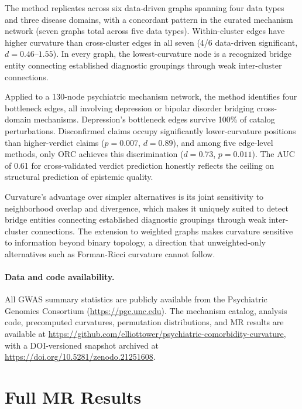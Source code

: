 \documentclass[11pt]{article}
\begin{document}
The method replicates across six data-driven graphs spanning four data types and three disease domains, with a concordant pattern in the curated mechanism network (seven graphs total across five data types). Within-cluster edges have higher curvature than cross-cluster edges in all seven (4/6 data-driven significant, $d = 0.46$--$1.55$). In every graph, the lowest-curvature node is a recognized bridge entity connecting established diagnostic groupings through weak inter-cluster connections.

Applied to a 130-node psychiatric mechanism network, the method identifies four bottleneck edges, all involving depression or bipolar disorder bridging cross-domain mechanisms. Depression's bottleneck edges survive 100\% of catalog perturbations. Disconfirmed claims occupy significantly lower-curvature positions than higher-verdict claims ($p = 0.007$, $d = 0.89$), and among five edge-level methods, only ORC achieves this discrimination ($d = 0.73$, $p = 0.011$). The AUC of 0.61 for cross-validated verdict prediction honestly reflects the ceiling on structural prediction of epistemic quality.

Curvature's advantage over simpler alternatives is its joint sensitivity to neighborhood overlap and divergence, which makes it uniquely suited to detect bridge entities connecting established diagnostic groupings through weak inter-cluster connections. The extension to weighted graphs makes curvature sensitive to information beyond binary topology, a direction that unweighted-only alternatives such as Forman-Ricci curvature \citep{sreejith2016forman} cannot follow.

\paragraph{Data and code availability.} All GWAS summary statistics are publicly available from the Psychiatric Genomics Consortium (\url{https://pgc.unc.edu}). The mechanism catalog, analysis code, precomputed curvatures, permutation distributions, and MR results are available at \url{https://github.com/elliottower/psychiatric-comorbidity-curvature}, with a DOI-versioned snapshot archived at \url{https://doi.org/10.5281/zenodo.21251608}.




\appendix

\section{Full MR Results}
\label{app:mr}
\end{document}
